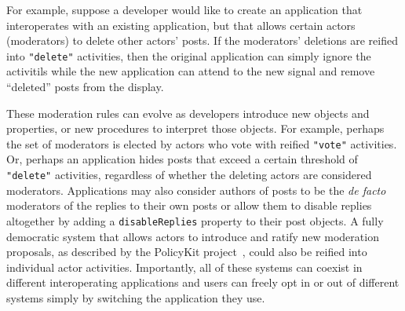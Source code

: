

For example, suppose a developer would like to create an application
that interoperates with an existing application,
but that allows certain actors (moderators) to delete other actors' posts.
If the moderators' deletions are reified into \texttt{"delete"} activities,
then the original application can simply ignore the activitils
while the new application can attend to the new signal and remove ``deleted'' posts from the display.

These moderation rules can evolve as developers
introduce new objects and properties,
or new procedures to interpret those objects.
For example,
perhaps the set of moderators is elected by actors who vote with reified \texttt{"vote"} activities.
Or, perhaps an application hides posts that exceed a certain threshold of \texttt{"delete"} activities,
regardless of whether the deleting actors are considered moderators.
Applications may also consider authors of posts to be the \emph{de facto} moderators of the replies to their
own posts or allow them to disable replies altogether by adding a \texttt{disableReplies}
property to their post objects.
A fully democratic system that allows actors to introduce and ratify new moderation proposals,
as described by the PolicyKit project~\cite{policykit}, could also be reified into
individual actor activities.
Importantly, all of these systems can coexist in different interoperating
applications and users can freely opt in or out of different systems simply by switching
the application they use.

